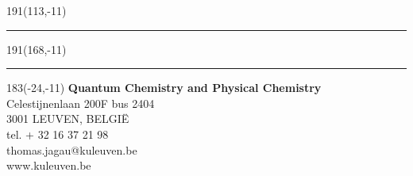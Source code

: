 \documentclass[12pt,a4paper,oneside]{book}
\begin{document}






\printbibliography

%


\appendix





\newpage
\thispagestyle{empty}
\sffamily
%
\begin{textblock}{191}(113,-11)
{\color{blueline}\rule{160pt}{5.5pt}}
\end{textblock}
%
\begin{textblock}{191}(168,-11)
{\color{blueline}\rule{5.5pt}{59pt}}
\end{textblock}
%
\begin{textblock}{183}(-24,-11)
\textblockcolour{}
\flushright
\fontsize{7}{7.5}\selectfont
\textbf{Quantum Chemistry and Physical Chemistry}\\
Celestijnenlaan 200F bus 2404\\
3001 LEUVEN, BELGI\"{E}\\
tel. + 32 16 37 21 98\\
thomas.jagau@kuleuven.be\\
www.kuleuven.be\\
\end{textblock}
%
\end{document}
